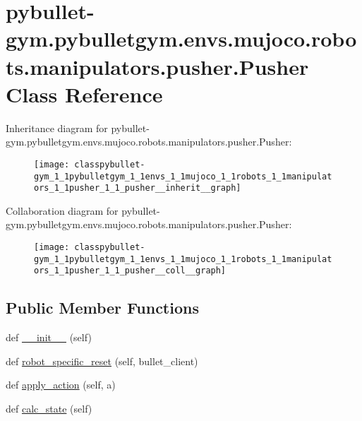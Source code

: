 \hypertarget{classpybullet-gym_1_1pybulletgym_1_1envs_1_1mujoco_1_1robots_1_1manipulators_1_1pusher_1_1_pusher}{}\section{pybullet-\/gym.pybulletgym.\+envs.\+mujoco.\+robots.\+manipulators.\+pusher.\+Pusher Class Reference}
\label{classpybullet-gym_1_1pybulletgym_1_1envs_1_1mujoco_1_1robots_1_1manipulators_1_1pusher_1_1_pusher}


Inheritance diagram for pybullet-\/gym.pybulletgym.\+envs.\+mujoco.\+robots.\+manipulators.\+pusher.\+Pusher\+:
\nopagebreak
\begin{figure}[H]
\begin{center}
\leavevmode
\texttt{[image: classpybullet-gym\_1\_1pybulletgym\_1\_1envs\_1\_1mujoco\_1\_1robots\_1\_1manipulators\_1\_1pusher\_1\_1\_pusher\_\_inherit\_\_graph]}
\end{center}
\end{figure}


Collaboration diagram for pybullet-\/gym.pybulletgym.\+envs.\+mujoco.\+robots.\+manipulators.\+pusher.\+Pusher\+:
\nopagebreak
\begin{figure}[H]
\begin{center}
\leavevmode
\texttt{[image: classpybullet-gym\_1\_1pybulletgym\_1\_1envs\_1\_1mujoco\_1\_1robots\_1\_1manipulators\_1\_1pusher\_1\_1\_pusher\_\_coll\_\_graph]}
\end{center}
\end{figure}
\subsection*{Public Member Functions}
\begin{DoxyCompactItemize}
\item 
def \hyperlink{classpybullet-gym_1_1pybulletgym_1_1envs_1_1mujoco_1_1robots_1_1manipulators_1_1pusher_1_1_pusher_aa77428e8bad18eb5e4b5e1f9cb53ae2e}{\+\_\+\+\_\+init\+\_\+\+\_\+} (self)
\item 
def \hyperlink{classpybullet-gym_1_1pybulletgym_1_1envs_1_1mujoco_1_1robots_1_1manipulators_1_1pusher_1_1_pusher_a4204c462c17e2966900666201624a9bb}{robot\+\_\+specific\+\_\+reset} (self, bullet\+\_\+client)
\item 
def \hyperlink{classpybullet-gym_1_1pybulletgym_1_1envs_1_1mujoco_1_1robots_1_1manipulators_1_1pusher_1_1_pusher_a762175a1fbeca8591dde65449877c8c2}{apply\+\_\+action} (self, a)
\item 
def \hyperlink{classpybullet-gym_1_1pybulletgym_1_1envs_1_1mujoco_1_1robots_1_1manipulators_1_1pusher_1_1_pusher_a8365fccf3e6709139d6ddc5847b652bf}{calc\+\_\+state} (self)
\end{DoxyCompactItemize}
